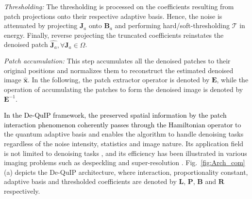 \documentclass[10pt,journal,compsoc]{IEEEtran}
\newcommand{\sd}{\textcolor{black}}
\def\bsx{{\boldsymbol{x}}}
\def\bsJ{{\boldsymbol{J}}}
\def\bsL{{\boldsymbol{L}}}
\def\bsP{{\boldsymbol{P}}}
\def\bsB{{\boldsymbol{B}}}
\def\bsE{{\boldsymbol{E}}}
\def\bsP{{\boldsymbol{P}}}
\def\bsR{{\boldsymbol{R}}}
\begin{document}
\textit{Thresholding:}
The thresholding is processed on the coefficients resulting from patch projections onto their respective adaptive basis. Hence, the noise is attenuated by projecting $\bsJ_a$ onto $\bsB_a$ and performing hard/soft-thresholding $\mathcal{T}$ in energy. Finally, reverse projecting the truncated coefficients reinstates the denoised patch $\hat{\bsJ_a}, \forall \bsJ_a \in \Omega$.




\textit{Patch accumulation:}
This step accumulates all the denoised patches to their original positions and normalizes them to reconstruct the estimated denoised image $\hat{\bsx}$. In the following, the patch extractor operator is denoted by $\bsE$, while the operation of accumulating the patches to form the denoised image is denoted by $\bsE^{-1}$.



\sd{In the De-QuIP framework, the preserved spatial information by the patch interaction phenomenon coherently passes through the Hamiltonian operator} to the quantum adaptive basis and enables the algorithm to handle denoising tasks regardless of the noise intensity, statistics and image nature. Its application field is not limited to denoising tasks \cite{dutta2021image, dutta2022novel}, and its efficiency has been illustrated in various imaging problems such as despeckling \cite{dutta2021despeckling} and super-resolution \cite{dutta2022quantum}. Fig.~\ref{fig:Arch_com}(a) depicts the De-QuIP architecture, where interaction, proportionality constant, adaptive basis and thresholded coefficients are denoted by $\bsL$, $\bsP$, $\bsB$ and $\bsR$ respectively.


\end{document}
